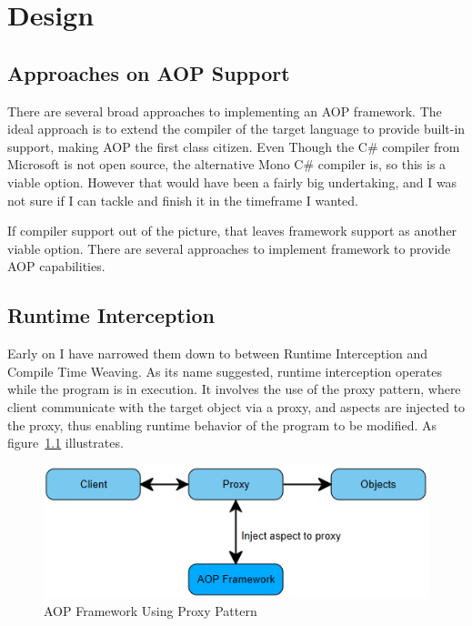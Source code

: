 \chapter{Design}

\section{Approaches on AOP Support}

There are several broad approaches to implementing an AOP framework. The ideal approach is to extend the compiler of the target language to provide built-in support, making AOP the first class citizen. Even Though the C\# compiler from Microsoft is not open source, the alternative Mono C\# compiler is, so this is a viable option. However that would have been a fairly big undertaking, and I was not sure if I can tackle and finish it in the timeframe I wanted.

If compiler support out of the picture, that leaves framework support as another viable option. There are several approaches to implement framework to provide AOP capabilities.

\section{Runtime Interception}

Early on I have narrowed them down to between Runtime Interception and Compile Time Weaving. As its name suggested, runtime interception operates while the program is in execution. It involves the use of the proxy pattern, where client communicate with the target object via a proxy, and aspects are injected to the proxy, thus enabling runtime behavior of the program to be modified. As figure~\ref{proxy_model} illustrates.

\begin{figure}[H]
  \includegraphics[scale=1.0]{Proxy.PNG}
  \centering
  \caption{AOP Framework Using Proxy Pattern\label{proxy_model}}
\end{figure}

